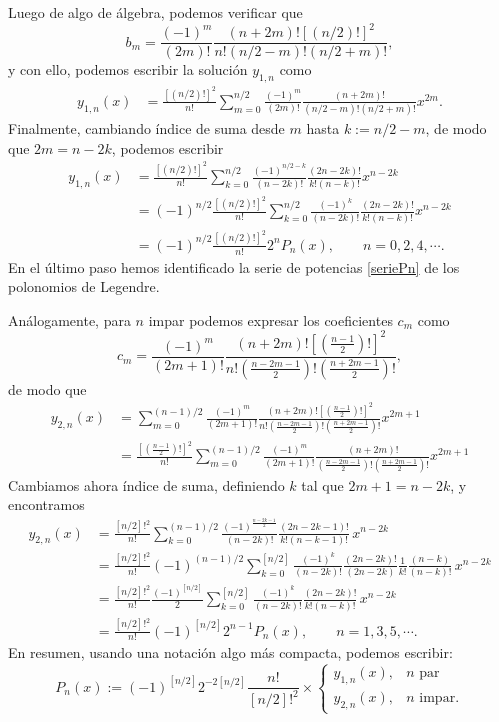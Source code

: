Luego de algo de álgebra, podemos verificar que
\begin{equation}
b_m=\frac{(-1)^m}{(2m)!}\frac{(n+2m)![(n/2)!]^2}{n!(n/2-m)!(n/2+m)!},
\end{equation}
y con ello, podemos escribir la solución $y_{1,n}$ como
\begin{align}
y_{1,n}(x) &= \frac{[(n/2)!]^2}{n!}\sum_{m=0}^{n/2}\frac{(-1)^m}{(2m)!}\frac{(n+2m)!}{(n/2-m)!(n/2+m)!}x^{2m}.
\end{align}
Finalmente, cambiando índice de suma desde $m$ hasta $k:=n/2-m$, de modo que $2m=n-2k$, podemos escribir
\begin{align}
y_{1,n}(x) &= \frac{[(n/2)!]^2}{n!}\sum_{k=0}^{n/2}\frac{(-1)^{n/2-k}}{(n-2k)!}\frac{(2n-2k)!}{k!(n-k)!}x^{n-2k} \\
&= (-1)^{n/2}\frac{[(n/2)!]^2}{n!}\sum_{k=0}^{n/2}\frac{(-1)^{k}}{(n-2k)!}\frac{(2n-2k)!}{k!(n-k)!}x^{n-2k} \\
&= (-1)^{n/2}\frac{[(n/2)!]^2}{n!} 2^n P_n(x), \qquad n=0,2,4,\cdots. \label{y1Pn}
\end{align}
En el último paso hemos identificado la serie de potencias \eqref{seriePn} de los polonomios de Legendre.

Análogamente, para $n$ impar podemos expresar los coeficientes $c_m$ como
\begin{equation}
c_m=\frac{(-1)^m}{(2m+1)!}\frac{(n+2m)![\left(\frac{n-1}{2}\right)!]^2}{n!\left(\frac{n-2m-1}{2}\right)!\left(\frac{n+2m-1}{2}\right)!},
\end{equation}
de modo que
\begin{align}
y_{2,n}(x) &= \sum_{m=0}^{(n-1)/2}\frac{(-1)^m}{(2m+1)!}\frac{(n+2m)![\left(\frac{n-1}{2}\right)!]^2}{n!\left(\frac{n-2m-1}{2}\right)!\left(\frac{n+2m-1}{2}\right)!}x^{2m+1} \\
&= \frac{[\left(\frac{n-1}{2}\right)!]^2}{n!}\sum_{m=0}^{(n-1)/2}\frac{(-1)^m}{(2m+1)!}\frac{(n+2m)!}{\left(\frac{n-2m-1}{2}\right)!\left(\frac{n+2m-1}{2}\right)!}x^{2m+1}
\end{align}
Cambiamos ahora índice de suma, definiendo $k$ tal que $2m+1=n-2k$, y encontramos
\begin{align}
y_{2,n}(x) &= \frac{[n/2]!^2}{n!}\sum_{k=0}^{(n-1)/2}\frac{(-1)^{\frac{n-2k-1}{2}}}{(n-2k)!}\frac{(2n-2k-1)!}{k!(n-k-1)!}\,x^{n-2k} \\
&= \frac{[n/2]!^2}{n!}(-1)^{(n-1)/2}\sum_{k=0}^{[n/2]}\frac{(-1)^k}{(n-2k)!}\frac{(2n-2k)!}{(2n-2k)}\frac{1}{k!}\frac{(n-k)}{(n-k)!}\,x^{n-2k} \\
&= \frac{[n/2]!^2}{n!}\frac{(-1)^{[n/2]}}{2}\sum_{k=0}^{[n/2]}\frac{(-1)^k}{(n-2k)!}\frac{(2n-2k)!}{k!(n-k)!}\,x^{n-2k} \\
&= \frac{[n/2]!^2}{n!}(-1)^{[n/2]}2^{n-1} P_n(x), \qquad n=1,3,5,\cdots. \label{y2Pn}
\end{align}
En resumen, usando una notación algo más compacta, podemos escribir:
\begin{equation}
P_n(x):=(-1)^{[n/2]}2^{-2[n/2]}\frac{n!}{[n/2]!^2} \times
	\begin{cases}
	y_{1,n}(x) , & n \text{ par}\\
	y_{2,n}(x), & n \text{ impar}.
	\end{cases}
\end{equation}

